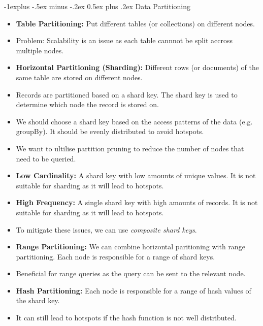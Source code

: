 \documentclass[10pt, landscape]{article}
\makeatletter
\renewcommand{\subsection}{\@startsection{subsection}{2}{0mm}%
  {-1explus -.5ex minus -.2ex}%
  {0.5ex plus .2ex}%
{\normalfont\normalsize\bfseries}}
\makeatother
\begin{document}
\begin{multicols*}{4}
  \subsection{Data Partitioning}
  \begin{itemize}
    \item \textbf{Table Partitioning:} Put different tables (or collections) on different nodes.
    \item Problem: Scalability is an issue as each table cannnot be split accross multiple nodes.
    \item \textbf{Horizontal Partitioning (Sharding):} Different rows (or documents) of the same table are stored on different nodes.
    \item Records are partitioned based on a shard key. The shard key is used to determine which node the record is stored on.
    \item We should choose a shard key based on the access patterns of the data (e.g. groupBy). It should be evenly distributed to avoid hotspots.
    \item We want to ultilise partition pruning to reduce the number of nodes that need to be queried.
    \item \textbf{Low Cardinality:} A shard key with low amounts of unique values. It is not suitable for sharding as it will lead to hotspots.
    \item \textbf{High Frequency:} A single shard key with high amounts of records. It is not suitable for sharding as it will lead to hotspots.
    \item To mitigate these issues, we can use \textit{composite shard keys}.
    \item \textbf{Range Partitioning:} We can combine horizontal paritioning with range partitioning. Each node is responsible for a range of shard keys.
    \item Beneficial for range queries as the query can be sent to the relevant node.
    \item \textbf{Hash Partitioning:} Each node is responsible for a range of hash values of the shard key.
    \item It can still lead to hotspots if the hash function is not well distributed.
  \end{itemize}


\end{multicols*}
\end{document}
